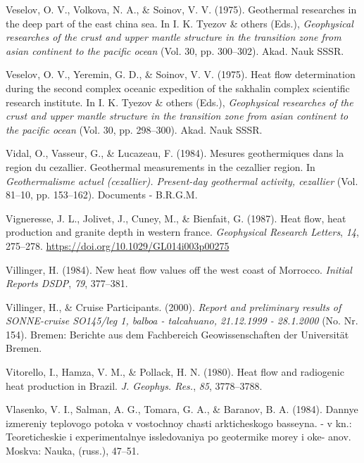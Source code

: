 \documentclass[draft,linenumbers]{agujournal2018}
\begin{document}
\leavevmode{}%
Veselov, O. V., Volkova, N. A., \& Soinov, V. V. (1975). Geothermal
researches in the deep part of the east china sea. In I. K. Tyezov \&
others (Eds.), \emph{Geophysical researches of the crust and upper
mantle structure in the transition zone from asian continent to the
pacific ocean} (Vol. 30, pp. 300--302). Akad. Nauk SSSR.

\leavevmode{}%
Veselov, O. V., Yeremin, G. D., \& Soinov, V. V. (1975). Heat flow
determination during the second complex oceanic expedition of the
sakhalin complex scientific research institute. In I. K. Tyezov \&
others (Eds.), \emph{Geophysical researches of the crust and upper
mantle structure in the transition zone from asian continent to the
pacific ocean} (Vol. 30, pp. 298--300). Akad. Nauk SSSR.

\leavevmode{}%
Vidal, O., Vasseur, G., \& Lucazeau, F. (1984). Mesures geothermiques
dans la region du cezallier. Geothermal measurements in the cezallier
region. In \emph{Geothermalisme actuel (cezallier). Present-day
geothermal activity, cezallier} (Vol. 81--10, pp. 153--162). Documents -
B.R.G.M.

\leavevmode{}%
Vigneresse, J. L., Jolivet, J., Cuney, M., \& Bienfait, G. (1987). Heat
flow, heat production and granite depth in western france.
\emph{Geophysical Research Letters}, \emph{14}, 275--278.
\url{https://doi.org/10.1029/GL014i003p00275}

\leavevmode{}%
Villinger, H. (1984). New heat flow values off the west coast of
{Morrocco}. \emph{Initial Reports DSDP}, \emph{79}, 377--381.

\leavevmode{}%
Villinger, H., \& Cruise Participants. (2000). \emph{Report and
preliminary results of SONNE-cruise SO145/leg 1, balboa - talcahuano,
21.12.1999 - 28.1.2000} (No. Nr. 154). Bremen: Berichte aus dem
Fachbereich Geowissenschaften der Universität Bremen.

\leavevmode{}%
Vitorello, I., Hamza, V. M., \& Pollack, H. N. (1980). Heat flow and
radiogenic heat production in {Brazil}. \emph{J. Geophys. Res.},
\emph{85}, 3778--3788.

\leavevmode{}%
Vlasenko, V. I., Salman, A. G., Tomara, G. A., \& Baranov, B. A. (1984).
Dannye izmereniy teplovogo potoka v vostochnoy chasti arkticheskogo
basseyna. - v kn.: Teoreticheskie i experimentalnye issledovaniya po
geotermike morey i oke- anov. Moskva: Nauka, (russ.), 47--51.
\end{document}
